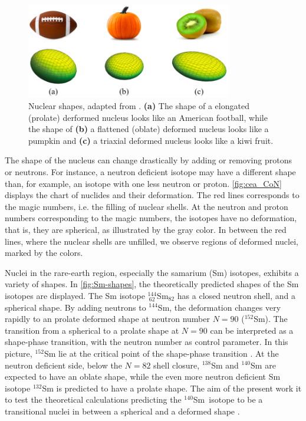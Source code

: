 \documentclass[twoside,english]{uiofysmaster/uiofysmaster}
\newcommand{\Sm}{$^{140}$Sm} %
\let\orgautoref\autoref
\renewcommand{\autoref}
        {%
		 \def\sectionautorefname{Section}%
		 \def\subsectionautorefname{Section}%
		 \def\subsubsectionautorefname{Section}%
		 \def\chapterautorefname{Chapter}%
          \orgautoref}
\begin{document}
\begin{figure}[htb]
	\centering
	\includegraphics[width=0.8\textwidth]{Images/nuclear-shapes-v2.png}
	\caption{Nuclear shapes, adapted from \cite{MSU-shapes}. 
	\textbf{(a)} The shape of a elongated (prolate) derformed nucleus looks like an American football, while the shape of \textbf{(b)} a flattened (oblate) deformed nucleus looks like a pumpkin and \textbf{(c)} a triaxial deformed nucleus looks like a kiwi fruit.}
	\label{fig:Nuclear-shapes}
\end{figure}


The shape of the nucleus can change drastically by adding or removing protons or neutrons. 
For instance, a neutron deficient isotope may have a different shape than, for example, an isotope with one less neutron or proton.
\autoref{fig:cea_CoN} displays the chart of nuclides and their deformation. 
The red lines corresponds to the magic numbers, i.e. the filling of nuclear shells. 
At the neutron and proton numbers corresponding to the magic numbers, the isotopes have no deformation, that is, they are spherical, as illustrated by the gray color. 
In between the red lines, where the nuclear shells are unfilled, we observe regions of deformed nuclei, marked by the colors. 

Nuclei in the rare-earth region, especially the samarium (Sm) isotopes, exhibits a variety of shapes. 
In \autoref{fig:Sm-shapes}, the theoretically predicted shapes of the Sm isotopes are displayed. 
The Sm isotope $^{144}_{~62}$Sm$_{82}$ has a closed neutron shell, and a spherical shape.
By adding neutrons to $^{144}$Sm, the deformation changes very rapidly to an prolate deformed shape at neutron number $N = 90$ ($^{152}$Sm). 
The transition from a spherical to a prolate shape at $N = 90$ can be interpreted as a shape-phase transition, with the neutron number as control parameter. 
In this picture, $^{152}$Sm lie at the critical point of the shape-phase transition \cite{Casten2001}.
At the neutron deficient side, below the $N = 82$ shell closure, $^{138}$Sm and $^{140}$Sm are expected to have an oblate shape, while the even more neutron deficient Sm isotope $^{132}$Sm is predicted to have a prolate shape. 
The aim of the present work it to test the theoretical calculations predicting the \Sm\ isotope to be a transitional nuclei in between a spherical and a deformed shape \cite{Iachello2000}.
\end{document}
